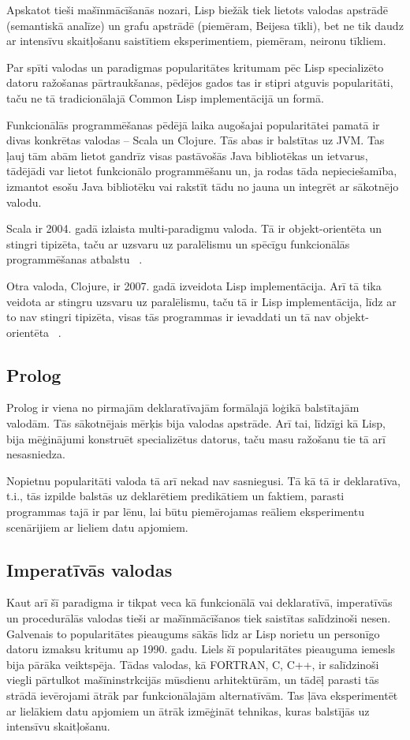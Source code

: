 \documentclass{ludis}
\begin{document}
Apskatot tieši mašīnmācīšanās nozari, Lisp biežāk tiek lietots valodas apstrādē (semantiskā analīze) un grafu apstrādē (piemēram, Beijesa tīkli), bet ne tik daudz ar intensīvu skaitļošanu saistītiem eksperimentiem, piemēram, neironu tīkliem.

Par spīti valodas un paradigmas popularitātes kritumam pēc Lisp specializēto datoru ražošanas pārtraukšanas, pēdējos gados tas ir stipri atguvis popularitāti, taču ne tā tradicionālajā Common Lisp implementācijā un formā.

Funkcionālās programmēšanas pēdējā laika augošajai popularitātei pamatā ir divas konkrētas valodas -- Scala un Clojure. Tās abas ir balstītas uz JVM. Tas ļauj tām abām lietot gandrīz visas pastāvošās Java bibliotēkas un ietvarus, tādējādi var lietot funkcionālo programmēšanu un, ja rodas tāda nepieciešamība, izmantot esošu Java bibliotēku vai rakstīt tādu no jauna un integrēt ar sākotnējo valodu.

Scala ir 2004. gadā izlaista multi-paradigmu valoda. Tā ir objekt-orientēta un stingri tipizēta, taču ar uzsvaru uz paralēlismu un spēcīgu funkcionālās programmēšanas atbalstu ~\cite{scala_org}.

Otra valoda, Clojure, ir 2007. gadā izveidota Lisp implementācija. Arī tā tika veidota ar stingru uzsvaru uz paralēlismu, taču tā ir Lisp implementācija, līdz ar to nav stingri tipizēta, visas tās programmas ir ievaddati un tā nav objekt-orientēta ~\cite{clojure_org}.

\subsection{Prolog}
Prolog ir viena no pirmajām deklaratīvajām formālajā loģikā balstītajām valodām. Tās sākotnējais mērķis bija valodas apstrāde. Arī tai, līdzīgi kā Lisp, bija mēģinājumi konstruēt specializētus datorus, taču masu ražošanu tie tā arī nesasniedza.

Nopietnu popularitāti valoda tā arī nekad nav sasniegusi. Tā kā tā ir deklaratīva, t.i., tās izpilde balstās uz deklarētiem predikātiem un faktiem, parasti programmas tajā ir par lēnu, lai būtu piemērojamas reāliem eksperimentu scenārijiem ar lieliem datu apjomiem.

\subsection{Imperatīvās valodas}
 Kaut arī šī paradigma ir tikpat veca kā funkcionālā vai deklaratīvā, imperatīvās un procedurālās valodas tieši ar mašīnmācīšanos tiek saistītas salīdzinoši nesen. Galvenais to popularitātes pieaugums sākās līdz ar Lisp norietu un personīgo datoru izmaksu kritumu ap 1990. gadu. Liels šī popularitātes pieauguma iemesls bija pārāka veiktspēja. Tādas valodas, kā FORTRAN, C, C++, ir salīdzinoši viegli pārtulkot mašīninstrkcijās mūsdienu arhitektūrām, un tādēļ parasti tās strādā ievērojami ātrāk par funkcionālajām alternatīvām. Tas ļāva eksperimentēt ar lielākiem datu apjomiem un ātrāk izmēģināt tehnikas, kuras balstījās uz intensīvu skaitļošanu.
\end{document}
